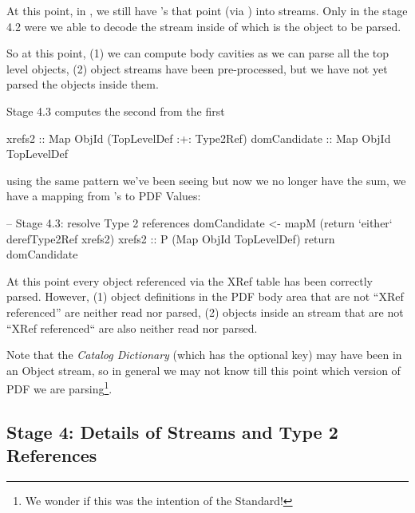 At this point, in , we still have 's that point
(via ) into  streams.
Only in the stage 4.2 were we able to decode the stream inside of
which is the object to be parsed.


So at this point, (1) we can compute body cavities  as
we can parse all the top level objects, (2) object streams have been
pre-processed, but we have not yet parsed the objects inside them.

Stage 4.3 computes the second from the first
\begin{codeNoExecute}
  xrefs2       :: Map ObjId (TopLevelDef :+: Type2Ref) 
  domCandidate :: Map ObjId TopLevelDef
\end{codeNoExecute}
using the same pattern we've been seeing but now we no longer have 
the sum, we have a mapping from 's to PDF Values:
\begin{code}
    -- Stage 4.3: resolve Type 2 references
    domCandidate <- mapM
                     (return `either` derefType2Ref xrefs2)
                     xrefs2
                    :: P (Map ObjId TopLevelDef)
    return domCandidate
\end{code}

At this point every object referenced via the XRef table has been
correctly parsed. However, (1) object definitions in the PDF body
area that are not ``XRef referenced'' are neither read nor parsed,
(2) objects inside an  stream that are not ``XRef
referenced`` are also neither read nor parsed.

Note that the \emph{Catalog Dictionary} (which has the optional
 key) may have been in an Object stream, so in general
we may not know till this point which version of PDF we are
parsing\footnote{We wonder if this was the intention of the Standard!}.

\subsection{Stage 4: Details of Streams and Type 2 References }

